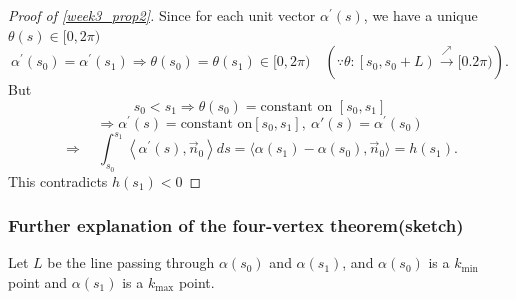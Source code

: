 \begin{proof}[Proof of \cref{week3_prop2}]
    Since for each unit vector $\alpha^{\prime}(s)$, we have a unique $\theta(s)\in [0,2 \pi)$
    $$
        \alpha^{\prime}\left(s_0\right)=\alpha^{\prime}\left(s_1\right) \Rightarrow \theta\left(s_0\right)=\theta\left(s_1\right)\in [0,2 \pi) \quad\left(\because \theta:\left[s_0, s_0+L\right) \stackrel{\nearrow }{\rightarrow}[0.2 \pi)\right).
    $$
    But \[s_0<s_1 \Rightarrow \theta(s_0)= \text{constant on } \left[s_0,s_1\right]\]
    \[\Rightarrow \alpha^{\prime}(s)=\text{constant on} \left[s_0 , s_1\right] ,~\alpha'(s)=\alpha^{\prime}(s_0)\]
    \[\Rightarrow \quad \int_{s_0}^{s_1}\left\langle\alpha^{\prime}(s), \vec{n}_0\right\rangle d s=\langle\alpha(s_1)-\alpha(s_0),\vec{n}_0\rangle=h(s_1).\]
    This contradicts $h(s_1)<0$
\end{proof}
\subsubsection*{Further explanation of the four-vertex theorem(sketch)}
Let $L$ be the line passing through $\alpha(s_0)$ and $\alpha(s_1)$, and $\alpha(s_0)$ is a $k_{\min}$ point and $\alpha(s_1)$ is a $k_{\max}$ point.

